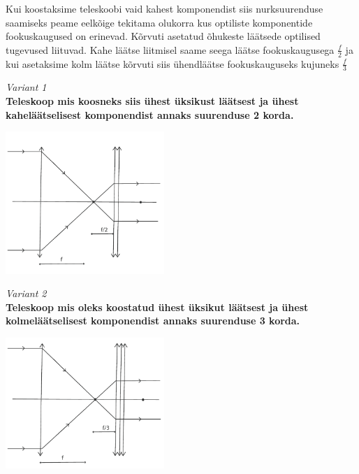 \documentclass[10pt]{article}
\begin{document}
\setAuthor{}

\solu
Kui koostaksime teleskoobi vaid kahest komponendist siis nurksuurenduse saamiseks peame eelkõige tekitama olukorra kus optiliste komponentide fookuskaugused on erinevad.
Kõrvuti asetatud õhukeste läätsede optilised tugevused liituvad. Kahe läätse liitmisel saame seega läätse fookuskaugusega $ \frac{f}{2} $ ja kui asetaksime kolm läätse kõrvuti siis ühendläätse fookuskauguseks kujuneks $ \frac{f}{3} $

\vspace{20pt}
\emph{Variant 1}\\
\textbf{Teleskoop mis koosneks siis ühest üksikust läätsest ja ühest kaheläätselisest komponendist annaks suurenduse 2 korda.}

\vspace{-10pt}
  \begin{center}
    \includegraphics[width=0.45\textwidth]{2020-v2g-10-yl1.pdf}
  \end{center}
  \vspace{-10pt}
  


\emph{Variant 2}\\
\textbf{Teleskoop mis oleks koostatud ühest üksikut läätsest ja ühest kolmeläätselisest komponendist annaks suurenduse 3 korda.}

\vspace{-10pt}
  \begin{center}
    \includegraphics[width=0.45\textwidth]{2020-v2g-10-yl2.pdf}
  \end{center}
  \vspace{-10pt}
\end{document}
